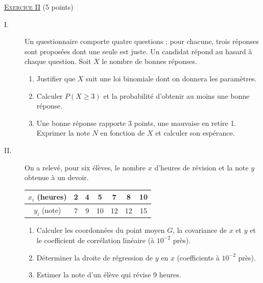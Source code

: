 \noindent \underline{\textsc{Exercice II}} (5 points)
\begin{description}
      \item[I.] Un questionnaire comporte quatre questions ; pour chacune, trois r\'eponses sont propos\'ees dont une seule est juste.
            Un candidat r\'epond au hasard \`a chaque question. Soit $X$ le nombre de bonnes r\'eponses.
            \begin{enumerate}
            \item Justifier que $X$ suit une loi binomiale dont on donnera les param\`etres.
            \item Calculer $P(X \geq 3)$ et la probabilit\'e d'obtenir au moins une bonne r\'eponse.
            \item Une bonne r\'eponse rapporte 3 points, une mauvaise en retire 1. Exprimer la note $N$ en fonction de $X$
                  et calculer son esp\'erance.
            \end{enumerate}
      \item[II.] On a relev\'e, pour six \'el\`eves, le nombre $x$ d'heures de r\'evision et la note $y$ obtenue \`a un devoir.
            \begin{center}
            \begin{tabular}{|c|c|c|c|c|c|c|}
            \hline
            $x_i$ (heures) & 2 & 4 & 5 & 7 & 8 & 10 \\
            \hline
            $y_i$ (note) & 7 & 9 & 10 & 12 & 12 & 15 \\
            \hline
            \end{tabular}
            \end{center}
            \begin{enumerate}
            \item Calculer les coordonn\'ees du point moyen $G$, la covariance de $x$ et $y$ et le coefficient de corr\'elation
                  lin\'eaire (\`a $10^{-2}$ pr\`es).
            \item D\'eterminer la droite de r\'egression de $y$ en $x$ (coefficients \`a $10^{-2}$ pr\`es).
            \item Estimer la note d'un \'el\`eve qui r\'evise 9 heures.
            \end{enumerate}
\end{description}

